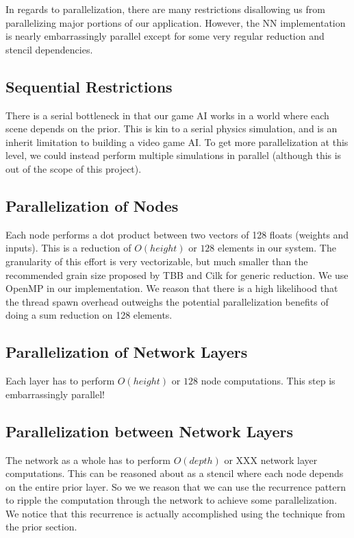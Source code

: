 \label{parallel}
In regards to parallelization, there are many restrictions disallowing us from parallelizing major portions of our application.
However, the NN implementation is nearly embarrassingly parallel except for some very regular reduction and stencil dependencies.

\subsection*{Sequential Restrictions}
There is a serial bottleneck in that our game AI works in a world where each scene depends on the prior.
This is kin to a serial physics simulation, and is an inherit limitation to building a video game AI.
To get more parallelization at this level, we could instead perform multiple simulations in parallel (although this is out of the scope of this project).

\subsection*{Parallelization of Nodes}
Each node performs a dot product between two vectors of 128 floats (weights and inputs).
This is a reduction of $O(height)$ or $128$ elements in our system.
The granularity of this effort is very vectorizable, but much smaller than the recommended grain size proposed by TBB and Cilk for generic reduction.
We use OpenMP in our implementation. 
We reason that there is a high likelihood that the thread spawn overhead outweighs the potential parallelization benefits of doing a sum reduction on 128 elements.



\subsection*{Parallelization of Network Layers}
Each layer has to perform $O(height)$ or $128$ node computations.
This step is embarrassingly parallel!



\subsection*{Parallelization between Network Layers}
The network as a whole has to perform $O(depth)$ or XXX network layer computations.
This can be reasoned about as a stencil where each node depends on the entire prior layer.
So we we reason that we can use the recurrence pattern to ripple the computation through the network to achieve some parallelization.
We notice that this recurrence is actually accomplished using the technique from the prior section.

